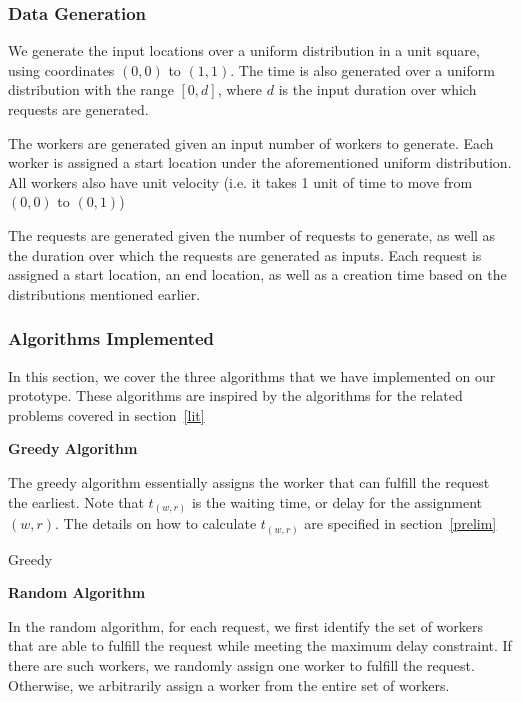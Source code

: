 \documentclass[urop]{nurop}
\begin{document}
\subsubsection{Data Generation}
We generate the input locations over a uniform distribution in a unit square, using coordinates $(0,0)$ to $(1,1)$. The time is also generated over a uniform distribution with the range $[0, d]$, where $d$ is the input duration over which requests are generated. 

The workers are generated given an input number of workers to generate. Each worker is assigned a start location under the aforementioned uniform distribution. All workers also have unit velocity (i.e. it takes 1 unit of time to move from $(0,0)$ to $(0,1)$)

The requests are generated given the number of requests to generate, as well as the duration over which the requests are generated as inputs. Each request is assigned a start location, an end location, as well as a creation time based on the distributions mentioned earlier.

\subsubsection{Algorithms Implemented}

In this section, we cover the three algorithms that we have implemented on our prototype. These algorithms are inspired by the algorithms for the related problems covered in section~\ref{lit}

\vspace{2mm} \noindent \textbf{Greedy Algorithm}

\noindent The greedy algorithm essentially assigns the worker that can fulfill the request the earliest. Note that $t_{(w,r)}$ is the waiting time, or delay for the assignment $(w,r)$. The details on how to calculate $t_{(w,r)}$ are specified in section~\ref{prelim}

\begin{algorithm}[H]
\SetAlgoLined
{}
 \caption{Greedy}
\end{algorithm}



\vspace{2mm} \noindent \textbf{Random Algorithm}

\noindent In the random algorithm, for each request, we first identify the set of workers that are able to fulfill the request while meeting the maximum delay constraint. If there are such workers, we randomly assign one worker to fulfill the request. Otherwise, we arbitrarily assign a worker from the entire set of workers. 
\end{document}

